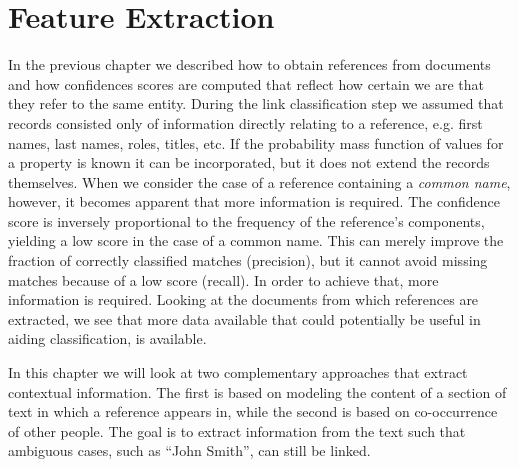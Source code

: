 \section{Feature Extraction}
\label{sec:feature_extraction}

In the previous chapter we described how to obtain references from documents and how confidences scores are computed that reflect how certain we are that they refer to the same entity.
During the link classification step we assumed that records consisted only of information directly relating to a reference, e.g. first names, last names, roles, titles, etc.
If the probability mass function of values for a property is known it can be incorporated, but it does not extend the records themselves.
When we consider the case of a reference containing a \emph{common name}, however, it becomes apparent that more information is required.
The confidence score is inversely proportional to the frequency of the reference's components, yielding a low score in the case of a common name.
This can merely improve the fraction of correctly classified matches (precision), but it cannot avoid missing matches because of a low score (recall).
In order to achieve that, more information is required.
Looking at the documents from which references are extracted, we see that more data available that could potentially be useful in aiding classification, is available.

In this chapter we will look at two complementary approaches that extract contextual information.
The first is based on modeling the content of a section of text in which a reference appears in, while the second is based on co-occurrence of other people.
The goal is to extract information from the text such that ambiguous cases, such as ``John Smith'', can still be linked.







